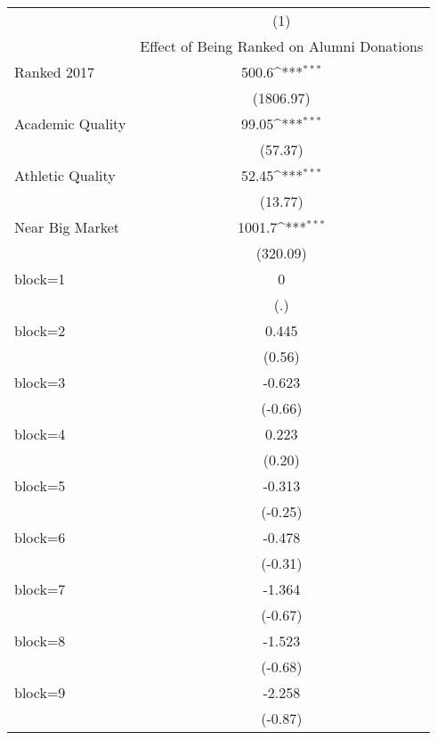 {
\def\sym#1{\ifmmode^{#1}\else\(^{#1}\)\fi}
\begin{longtable}{l*{1}{c}}
\hline\hline\endfirsthead\hline\endhead\hline\endfoot\endlastfoot
                    &\multicolumn{1}{c}{(1)}\\
                    &\multicolumn{1}{c}{Effect of Being Ranked on Alumni Donations}\\
\hline
Ranked 2017         &       500.6\sym{***}\\
                    &   (1806.97)         \\
[1em]
Academic Quality    &       99.05\sym{***}\\
                    &     (57.37)         \\
[1em]
Athletic Quality    &       52.45\sym{***}\\
                    &     (13.77)         \\
[1em]
Near Big Market     &      1001.7\sym{***}\\
                    &    (320.09)         \\
[1em]
block=1             &           0         \\
                    &         (.)         \\
[1em]
block=2             &       0.445         \\
                    &      (0.56)         \\
[1em]
block=3             &      -0.623         \\
                    &     (-0.66)         \\
[1em]
block=4             &       0.223         \\
                    &      (0.20)         \\
[1em]
block=5             &      -0.313         \\
                    &     (-0.25)         \\
[1em]
block=6             &      -0.478         \\
                    &     (-0.31)         \\
[1em]
block=7             &      -1.364         \\
                    &     (-0.67)         \\
[1em]
block=8             &      -1.523         \\
                    &     (-0.68)         \\
[1em]
block=9             &      -2.258         \\
                    &     (-0.87)         \\

\end{longtable}}
